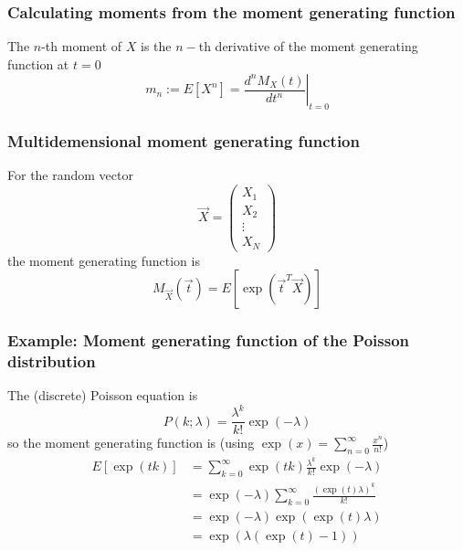 
\subsubsection{Calculating moments from the moment generating function}
The $n$-th moment of $X$ is the $n-$th derivative of the moment generating function at $t=0$
\begin{equation}
    m_n := E[X^n] = \left.\frac{d^n M_X(t)}{dt^n}\right|_{t=0}
\end{equation}

\subsubsection{Multidemensional moment generating function}
For the random vector
\begin{equation}
    \vec{X} = \left( \begin{array}{c}
        X_1 \\ X_2 \\ \vdots \\ X_N
    \end{array} \right)
\end{equation}
the moment generating function is
\begin{equation}
    M_{\vec{X}}(\vec{t}) = E[\exp(\vec{t}^T \vec{X})]
\end{equation}

\subsubsection{Example: Moment generating function of the Poisson distribution}
The (discrete) Poisson equation is
\begin{equation}
    P(k;\lambda) = \frac{\lambda^k}{k!} \exp{(-\lambda)}
\end{equation}
so the moment generating function is (using $\exp(x) = \sum_{n=0}^{\infty} \frac{x^n}{n!}$)
\begin{equation}
    \begin{aligned}
        E[\exp(tk)] &= \sum_{k=0}^{\infty} \exp(tk) \frac{\lambda^k}{k!} \exp{(-\lambda)} \\
         &= \exp{(-\lambda)} \sum_{k=0}^{\infty} \frac{\left(\exp(t)\lambda\right)^k}{k!} \\
         &= \exp{(-\lambda)} \exp{\left(\exp(t)\lambda\right)} \\
         &= \exp{\left(\lambda(\exp(t)-1)\right)}
    \end{aligned}
\end{equation}

